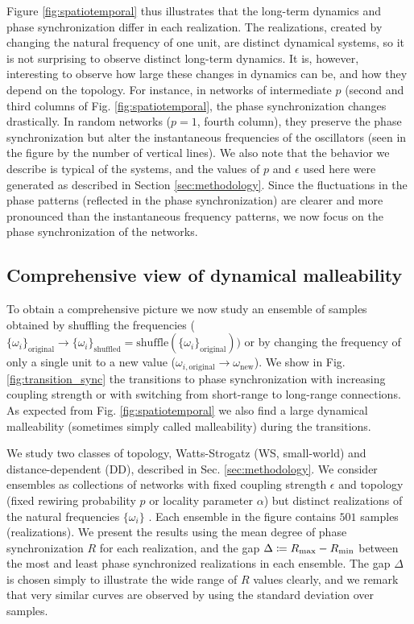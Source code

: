 Figure \ref{fig:spatiotemporal} thus illustrates that the long-term dynamics and phase synchronization differ in each realization. The realizations, created by changing the natural frequency of one unit, are distinct dynamical systems, so it is not surprising to observe distinct long-term dynamics. It is, however, interesting to observe how large these changes in dynamics can be, and how they depend on the topology. For instance, in networks of intermediate $p$ (second and third columns of Fig. \ref{fig:spatiotemporal}, the phase synchronization changes drastically. In random networks ($p = 1$, fourth column), they preserve the phase synchronization but alter the instantaneous frequencies of the oscillators (seen in the figure by the number of vertical lines). We also note that the behavior we describe is typical of the systems, and the values of $p$ and $\epsilon$ used here were generated as described in Section \ref{sec:methodology}. Since the fluctuations in the phase patterns (reflected in the phase synchronization) are clearer and more pronounced than the instantaneous frequency patterns, we now focus on the phase synchronization of the networks.

\subsection{Comprehensive view of dynamical malleability}
To obtain a comprehensive picture we now study an ensemble of samples obtained by shuffling the frequencies ($\{\omega_i\}_\mathrm{original} \to \{\omega_i\}_\mathrm{shuffled} = \mathrm{shuffle} \left( \{\omega_i\}_\mathrm{original} \right))$ or by changing the frequency of only a single unit to a new value ($\omega_{i, \mathrm{original}} \to \omega_\mathrm{\mathrm{new}}$). We show in Fig. \ref{fig:transition_sync} the transitions to phase synchronization with increasing coupling strength or with switching from short-range to long-range connections. As expected from Fig. \ref{fig:spatiotemporal} we also find a large dynamical malleability (sometimes simply called malleability) during the transitions. 

We study two classes of topology, Watts-Strogatz (WS, small-world) and distance-dependent (DD), described in Sec. \ref{sec:methodology}. We consider ensembles as collections of networks with fixed coupling strength $\epsilon$ and topology (fixed rewiring probability $p$ or locality parameter $\alpha$) but distinct realizations of the natural frequencies $\{\omega_i\}$ \cite{carlson2011sample}.  Each ensemble in the figure contains $501$ samples (realizations). We present the results using the mean degree of phase synchronization $R$ for each realization, and the gap $\Delta \coloneqq R_\mathrm{max} - R_\mathrm{min}$ between the most and least phase synchronized realizations in each ensemble. The gap $\Delta$ is chosen simply to illustrate the wide range of $R$ values clearly, and we remark that very similar curves are observed by using the standard deviation over samples.

